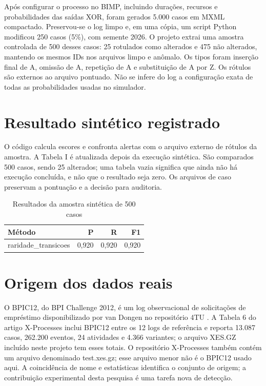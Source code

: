 \documentclass[conference]{IEEEtran}
\begin{document}
Após configurar o processo no BIMP, incluindo durações, recursos e probabilidades das saídas XOR, foram gerados 5.000 casos em MXML compactado. Preservou-se o log limpo e, em uma cópia, um script Python modificou 250 casos (5\%), com semente 2026. O projeto extrai uma amostra controlada de 500 desses casos: 25 rotulados como alterados e 475 não alterados, mantendo os mesmos IDs nos arquivos limpo e anômalo. Os tipos foram inserção final de A, omissão de A, repetição de A e substituição de A por Z. Os rótulos são externos ao arquivo pontuado. Não se infere do log a configuração exata de todas as probabilidades usadas no simulador.

\section{Resultado sintético registrado}
O código calcula escores e confronta alertas com o arquivo externo de rótulos da amostra. A Tabela I é atualizada depois da execução sintética. São comparados 500 casos, sendo 25 alterados; uma tabela vazia significa que ainda não há execução concluída, e não que o resultado seja zero. Os arquivos de caso preservam a pontuação e a decisão para auditoria. \begin{table}[t]\centering\caption{Resultados da amostra sintética de 500 casos}\begin{tabular}{lrrr}\toprule Método & P & R & F1\\\midrule raridade\_transicoes & 0,920 & 0,920 & 0,920 \\ \bottomrule\end{tabular}\end{table}

\clearpage
\section{Origem dos dados reais}
O BPIC12, do BPI Challenge 2012, é um log observacional de solicitações de empréstimo disponibilizado por van Dongen no repositório 4TU \cite{vandongen2012bpi}. A Tabela 6 do artigo X-Processes \cite{fantinato2023xprocesses} inclui BPIC12 entre os 12 logs de referência e reporta 13.087 casos, 262.200 eventos, 24 atividades e 4.366 variantes; o arquivo XES.GZ incluído neste projeto tem esses totais. O repositório X-Processes também contém um arquivo denominado test.xes.gz; esse arquivo menor não é o BPIC12 usado aqui. A coincidência de nome e estatísticas identifica o conjunto de origem; a contribuição experimental desta pesquisa é uma tarefa nova de detecção.
\end{document}

